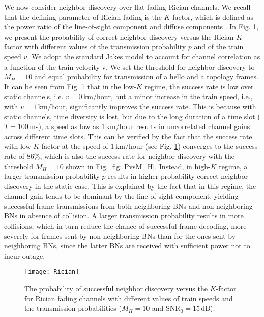 \documentclass[10pt,english,two column]{IEEEtran}
\begin{document}
We now consider neighbor discovery over flat-fading Rician channels.
We recall that the defining parameter of Rician fading is the $K$-factor,
which is defined as the power ratio of the line-of-sight component
and diffuse components \cite{Rappaport}. In Fig. \ref{fig:Rician},
we present the probability of correct neighbor discovery versus the
Rician $K$-factor with different values of the transmission probability
$p$ and of the train speed $v$. We adopt the standard Jakes model
\cite{Rappaport} to account for channel correlation as a function
of the train velocity v. We set the threshold for neighbor discovery
to $M_{H}=10$ and equal probability for transmission of a hello and
a topology frames. It can be seen from Fig. \ref{fig:Rician} that
in the low-$K$ regime, the success rate is low over static channels,
i.e. $v=0\,\mathrm{km/hour}$, but a minor increase in the train speed,
i.e., with $v=1\,\mathrm{km/hour}$, significantly improves the success
rate. This is because with static channels, time diversity is lost,
but due to the long duration of a time slot ($T=100\,\mathrm{ms}$),
a speed as low as $1\,\mathrm{km/hour}$ results in uncorrelated channel
gains across different time slots. This can be verified by the fact
that the success rate with low $K$-factor at the speed of $1\,\mathrm{km/hour}$
(see Fig. \ref{fig:Rician}) converges to the success rate of 86\%,
which is also the success rate for neighbor discovery with the threshold
$M_{H}=10$ shown in Fig. \ref{fig: PvsM_H}. Instead, in high-$K$
regime, a larger transmission probability $p$ results in higher probability
correct neighbor discovery  in the static case. This is explained
by the fact that in this regime, the channel gain tends to be dominant
by the line-of-sight component, yielding successful frame transmissions
from both neighboring BNs and non-neighboring BNs in absence of collision.
A larger transmission probability results in more collisions, which
in turn reduce the chance of successful frame decoding, more severely
for frames sent by non-neighboring BNs than for the ones sent by neighboring
BNs, since the latter BNs are received with sufficient power not to
incur outage. 

\begin{figure}[h]
\begin{centering}
\textsf{\texttt{[image: Rician]}}
\par\end{centering}

\caption{\label{fig:Rician}The probability of successful neighbor discovery
versus the $K$-factor for Rician fading channels with different values
of train speeds and the transmission probabilities ($M_{H}=10$ and
$\mathrm{SNR}_{0}=15\,\mathrm{dB}$). }
\end{figure}
\end{document}
